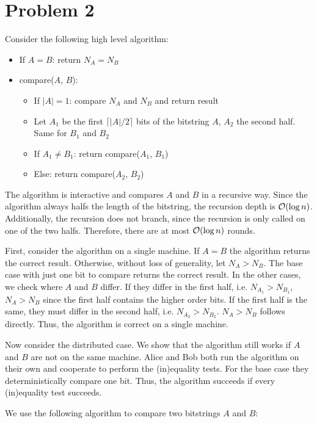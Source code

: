 \section*{Problem 2}

Consider the following high level algorithm:

\begin{itemize}
    \item If $A = B$: return $N_A = N_B$
    \item compare($A$, $B$):
    \begin{itemize}
        \item If $|A| = 1$: compare $N_A$ and $N_B$ and return result
        \item Let $A_1$ be the first $\lceil|A|/2\rceil$ bits of the bitstring $A$, $A_2$ the second half. Same for $B_1$ and $B_2$
        \item If $A_1 \neq B_1$: return compare($A_1$, $B_1$)
        \item Else: return compare($A_2$, $B_2$)
    \end{itemize}
\end{itemize}

The algorithm is interactive and compares $A$ and $B$ in a recursive way. Since the algorithm always halfs the length of the bitstring, the recursion depth is $\mathcal{O}(\log n)$. Additionally, the recursion does not branch, since the recursion is only called on one of the two halfs. Therefore, there are at most $\mathcal{O}(\log n)$ rounds.

First, consider the algorithm on a single machine. If $A = B$ the algorithm returns the correct result. Otherwise, without loss of generality, let $N_A > N_B$. The base case with just one bit to compare returns the correct result. In the other cases, we check where $A$ and $B$ differ. If they differ in the first half, i.e. $N_{A_1} > N_{B_1}$, $N_A > N_B$ since the first half contains the higher order bits. If the first half is the same, they must differ in the second half, i.e. $N_{A_2} > N_{B_2}$. $N_A > N_B$ follows directly. Thus, the algorithm is correct on a single machine.

Now consider the distributed case. We show that the algorithm still works if $A$ and $B$ are not on the same machine.
Alice and Bob both run the algorithm on their own and cooperate to perform the (in)equality tests. For the base case they deterministically compare one bit. Thus, the algorithm succeeds if every (in)equality test succeeds.

We use the following algorithm to compare two bitstrings $A$ and $B$:


